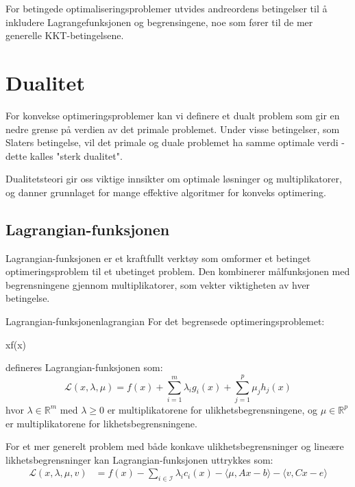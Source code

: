 For betingede optimaliseringsproblemer utvides andreordens betingelser til å inkludere Lagrangefunksjonen og begrensingene, noe som fører til de mer generelle KKT-betingelsene.

\chapter{Dualitet}
\label{chap:duality}

For konvekse optimeringsproblemer kan vi definere et dualt problem som gir en nedre grense på verdien av det primale problemet. Under visse betingelser, som Slaters betingelse, vil det primale og duale problemet ha samme optimale verdi - dette kalles "sterk dualitet".

Dualitetsteori gir oss viktige innsikter om optimale løsninger og multiplikatorer, og danner grunnlaget for mange effektive algoritmer for konveks optimering.

\section{Lagrangian-funksjonen}

Lagrangian-funksjonen er et kraftfullt verktøy som omformer et betinget optimeringsproblem til et ubetinget problem. Den kombinerer målfunksjonen med begrensningene gjennom multiplikatorer, som vekter viktigheten av hver betingelse.

\begin{definition}{Lagrangian-funksjonen}{lagrangian}
	For det begrensede optimeringsproblemet:
	\begin{mini*}
		{x}{f(x)}{}{}
	\end{mini*}
	defineres Lagrangian-funksjonen som:
	\[
		\mathcal{L}(x, \lambda, \mu) = f(x) + \sum_{i=1}^m \lambda_i g_i(x) + \sum_{j=1}^p \mu_j h_j(x)
	\]
	hvor \( \lambda \in \mathbb{R}^m \) med \( \lambda \geq 0 \) er multiplikatorene for ulikhetsbegrensningene, og \( \mu \in \mathbb{R}^p \) er multiplikatorene for likhetsbegrensningene.
\end{definition}

For et mer generelt problem med både konkave ulikhetsbegrensninger og lineære likhetsbegrensninger kan Lagrangian-funksjonen uttrykkes som:
\begin{align*}
	\mathcal{L}(x, \lambda, \mu, v) & = f(x) - \sum_{i \in \mathcal{I}} \lambda_i c_i(x) - \langle\mu, Ax - b\rangle - \langle v, Cx - e\rangle
\end{align*}

